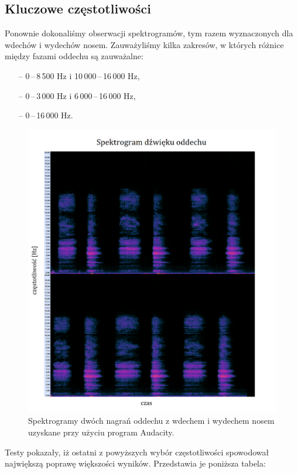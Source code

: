 \documentclass[polish]{article}
\begin{document}
\subsection{Kluczowe częstotliwości}
Ponownie dokonaliśmy obserwacji spektrogramów, tym razem wyznaczonych dla wdechów i wydechów nosem. Zauważyliśmy kilka zakresów, w których różnice między fazami oddechu są zauważalne:
\begin{itemize}
	\setlength\itemsep{-0.25em}
	\item[--] 0\,--\,8\,500 \unit{Hz} i 10\,000\,--\,16\,000 \unit{Hz},
	\item[--] 0\,--\,3\,000 \unit{Hz} i 6\,000\,--\,16\,000 \unit{Hz},
	\item[--] 0\,--\,16\,000 \unit{Hz}.
\end{itemize}
\begin{figure}[H]
	\centering
	\includegraphics[width=13cm]{spektrogram_wydech_nosem}
	\caption{Spektrogramy dwóch nagrań oddechu z wdechem i wydechem nosem uzyskane przy użyciu program Audacity.}
\end{figure}
Testy pokazały, iż ostatni z powyższych wybór częstotliwości spowodował największą poprawę większości wyników. Przedstawia je poniższa tabela:
\end{document}
